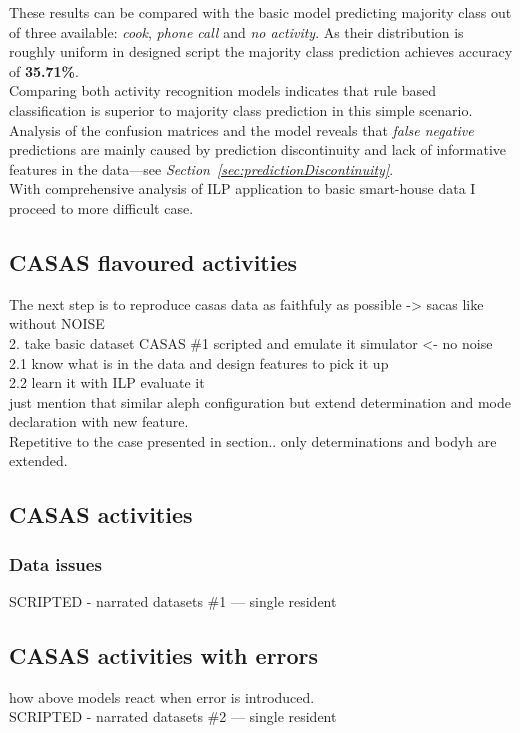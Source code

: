 \documentclass[11pt, a4paper, pdflatex, leqno, twoside, openright]{report}
\begin{document}
These results can be compared with the basic model predicting majority class out of three available: \emph{cook}, \emph{phone call} and \emph{no activity}. As their distribution is roughly uniform in designed script the majority class prediction achieves accuracy of \textbf{35.71\%}.\\
Comparing both activity recognition models indicates that rule based classification is superior to majority class prediction in this simple scenario.\\

Analysis of the confusion matrices and the model reveals that \emph{false negative} predictions are mainly caused by prediction discontinuity and lack of informative features in the data---see \emph{Section~\ref{sec:predictionDiscontinuity}}.\\

With comprehensive analysis of ILP application to basic smart-house data I proceed to more difficult case.


    \subsection{CASAS flavoured activities}
The next step is to reproduce casas data as faithfuly as possible -> sacas like without NOISE\\
2. take basic dataset CASAS \#1 scripted and emulate it simulator <- no noise\\
2.1 know what is in the data and design features to pick it up\\
2.2 learn it with ILP evaluate it\\
just mention that similar aleph configuration but extend determination and mode declaration with new feature.\\

Repetitive to the case presented in section.. only determinations and bodyh are extended.
    \subsection{CASAS activities}
      \subsubsection{Data issues}
SCRIPTED - narrated datasets \#1 --- single resident
    \subsection{CASAS activities with errors}
how above models react when error is introduced.\\
SCRIPTED - narrated datasets \#2 --- single resident
\end{document}
